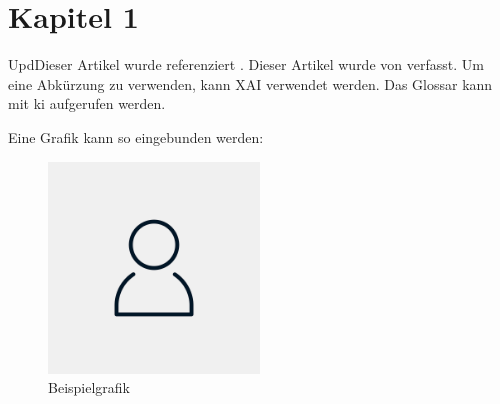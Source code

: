 \section{Kapitel 1}

UpdDieser Artikel wurde referenziert \cite{lowry_protein_1951}. Dieser Artikel wurde von \citeauthor{lowry_protein_1951} verfasst. Um eine Abkürzung zu verwenden, kann \ac{XAI} verwendet werden. Das Glossar kann mit \gls{ki} aufgerufen werden.

Eine Grafik kann so eingebunden werden:
\begin{figure}[H]
    \centering
    \includegraphics[width=0.5\textwidth]{assets/placehoder.png}
    \caption{Beispielgrafik}
    \label{fig:example}
\end{figure}

\lipsum[1-2]